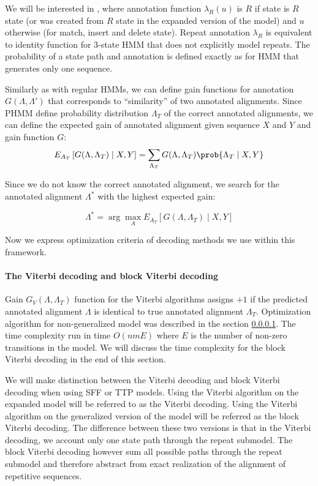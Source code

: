 We will be interested in , where annotation
function $\lambda_R(u)$ is $R$ if state is $R$ state (or was created from $R$
state in the expanded version of the model) and $u$ otherwise (for match,
insert and delete state). Repeat annotation $\lambda_R$ is equivalent to
identity function for 3-state HMM that does not explicitly model repeats.
The probability of a state path and annotation is defined exactly as for HMM
that generates only one sequence.

Similarly as with regular HMMs, we can define gain functions for annotation
$G(\Lambda, \Lambda')$ that corresponds to ``similarity'' of two annotated
alignments.  Since PHMM define probability distribution $\Lambda_T$ of the
correct annotated alignments, we can define the expected gain of annotated
alignment given sequence $X$ and $Y$ and gain function $G$:
\begin{equation}
E_{A_T}\left[G(\Lambda, \Lambda_T)\mid X, Y\right] = 
\sum_{\Lambda_T}G(\Lambda, \Lambda_T)\prob{\Lambda_T\mid X, Y}
\end{equation}

Since we do not know the correct annotated alignment, we search for the
annotated alignment $\Lambda^*$ with the highest expected gain:

\begin{equation}
\Lambda^* = \arg\max_AE_{A_T}\left[G(\Lambda, \Lambda_T)\mid X, Y\right]
\end{equation}

Now we express optimization criteria of decoding methods we use within this
framework. 

\paragraph{The Viterbi decoding and block Viterbi decoding} Gain $G_V(\Lambda,
\Lambda_T)$ function for the Viterbi algorithms assigns $+1$ if the predicted
annotated alignment $\Lambda$ is identical to true annotated alignment
$\Lambda_T$. Optimization algorithm for non-generalized model was described in
the section \ref{}.  The time complexity run in time $O(nmE)$ where $E$ is the
number of non-zero transitions in the model.  We will discuss the time
complexity for the block Viterbi decoding in the end of this section.

We will make distinction between the Viterbi decoding and block Viterbi
decoding when using SFF or TTP models. Using the Viterbi algorithm on the
expanded model will be referred to as the Viterbi decoding. Using the Viterbi
algorithm on the generalized version of the model will be referred as the block
Viterbi decoding. The difference between these two versions is that in the
Viterbi decoding, we account only one state path through the repeat submodel.
The block Viterbi decoding however sum all possible paths through the repeat
submodel and therefore abstract from exact realization of the alignment of
repetitive sequences.

